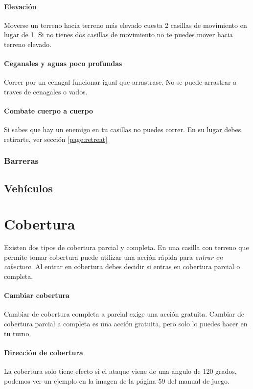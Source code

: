         \paragraph{Elevación}
        Moverse un terreno hacia terreno más elevado cuesta 2 casillas de movimiento en lugar de 1. Si no tienes dos casillas de movimiento no te puedes mover hacia terreno elevado.

        \paragraph{Ceganales y aguas poco profundas}
        Correr por un cenagal funcionar igual que arrastrase. No se puede arrastrar a traves de cenagales o vados.

        \paragraph{Combate cuerpo a cuerpo}
        Si sabes que hay un enemigo en tu casillas no puedes correr. En su lugar debes retirarte, ver sección \ref{page:retreat}

        \subsubsection{Barreras}

    \subsection{Vehículos}

\section{Cobertura}
    Existen dos tipos de cobertura parcial y completa. En una casilla con terreno que permite tomar cobertura puede utilizar una acción rápida para \emph{entrar en cobertura}.
    Al entrar en cobertura debes decidir si entras en cobertura parcial o completa.

    \paragraph{Cambiar cobertura}
    Cambiar de cobertura completa a parcial exige una acción gratuita. Cambiar de cobertura parcial a completa es una acción gratuita, pero solo lo puedes hacer en tu turno.

    \paragraph{Dirección de cobertura}
    La cobertura solo tiene efecto si el ataque viene de una angulo de 120 grados, podemos ver un ejemplo en la imagen de la página 59 del manual de juego.

